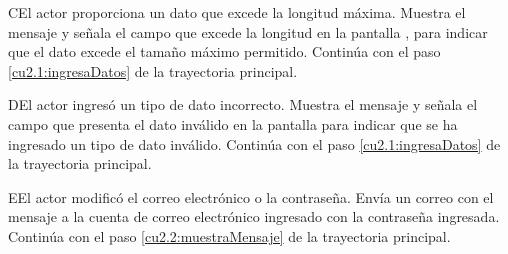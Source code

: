  \begin{UCtrayectoriaA}{C}{El actor proporciona un dato que excede la longitud máxima.}
    \UCpaso[\UCsist] Muestra el mensaje  y señala el campo que excede la 
    longitud en la pantalla , para indicar que el dato excede el tamaño máximo permitido.
    \UCpaso[] Continúa con el paso \ref{cu2.1:ingresaDatos} de la trayectoria principal.
 \end{UCtrayectoriaA}
 
 \begin{UCtrayectoriaA}{D}{El actor ingresó un tipo de dato incorrecto.}
    \UCpaso[\UCsist] Muestra el mensaje  y señala el campo que presenta el dato inválido en la 
    pantalla  para indicar que se ha ingresado un tipo de dato inválido.
    \UCpaso[] Continúa con el paso \ref{cu2.1:ingresaDatos} de la trayectoria principal.
 \end{UCtrayectoriaA}
 \begin{UCtrayectoriaA}{E}{El actor modificó el correo electrónico o la contraseña.}
    \UCpaso[\UCsist] Envía un correo con el mensaje  a la cuenta de correo electrónico ingresado con la contraseña ingresada.
    \UCpaso[] Continúa con el paso \ref{cu2.2:muestraMensaje} de la trayectoria principal.
 \end{UCtrayectoriaA}
 